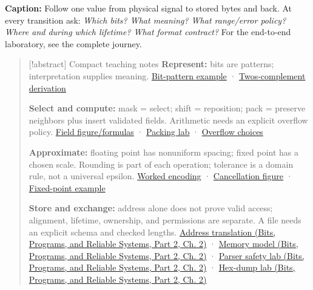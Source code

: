 
\textbf{Caption:} Follow one value from physical signal to stored bytes and back. At every transition ask: \emph{Which bits? What meaning? What range/error policy? Where and during which lifetime? What format contract?} For the end-to-end laboratory, see {the complete journey}.

\begin{quote}
{[}!abstract{]} Compact teaching notes \textbf{Represent:} bits are patterns; interpretation supplies meaning. \hyperref[01-foundations-i-ch001-one-bit-several-bits-and-an-interpretation]{Bit-pattern example} · \hyperref[01-foundations-i-ch001-why-invert-and-add-one-works]{Two\textquotesingle s-complement derivation}

\textbf{Select and compute:} mask = select; shift = reposition; pack = preserve neighbors plus insert validated fields. Arithmetic needs an explicit overflow policy. \hyperref[01-foundations-i-ch001-fields-select-normalize-replace]{Field figure/formulas} · \hyperref[01-foundations-i-ch001-test-the-packed-meaning]{Packing lab} · \hyperref[01-foundations-i-ch001-choose-the-overflow-policy-before-calculating]{Overflow choices}

\textbf{Approximate:} floating point has nonuniform spacing; fixed point has a chosen scale. Rounding is part of each operation; tolerance is a domain rule, not a universal epsilon. \hyperref[01-foundations-i-ch001-encode-10.625-then-decode-13.25]{Worked encoding} · \hyperref[01-foundations-i-ch001-cancellation-can-expose-errors-made-earlier]{Cancellation figure} · \hyperref[01-foundations-i-ch001-a-fixed-ruler-for-fractional-values]{Fixed-point example}

\textbf{Store and exchange:} address alone does not prove valid access; alignment, lifetime, ownership, and permissions are separate. A file needs an explicit schema and checked lengths. \href{../01-Bits-Programs-and-Reliable-Systems-P02/main.pdf\#01-foundations-i-ch002-virtual-memory-translates-page-identity}{Address translation (Bits, Programs, and Reliable Systems, Part 2, Ch. 2)} · \href{../01-Bits-Programs-and-Reliable-Systems-P02/main.pdf\#01-foundations-i-ch002-storage-lifetime-ownership-and-placement-are-different-axes}{Memory model (Bits, Programs, and Reliable Systems, Part 2, Ch. 2)} · \href{../01-Bits-Programs-and-Reliable-Systems-P02/main.pdf\#01-foundations-i-ch002-validate-lengths-before-performing-the-arithmetic-they-request}{Parser safety lab (Bits, Programs, and Reliable Systems, Part 2, Ch. 2)} · \href{../01-Bits-Programs-and-Reliable-Systems-P02/main.pdf\#01-foundations-i-ch002-read-a-dump-by-reversing-the-contract}{Hex-dump lab (Bits, Programs, and Reliable Systems, Part 2, Ch. 2)}
\end{quote}

